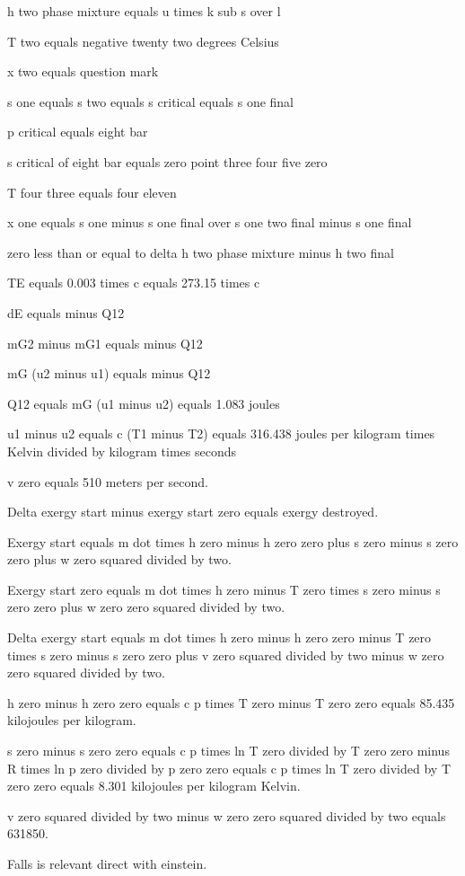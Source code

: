 h two phase mixture equals u times k sub s over l

T two equals negative twenty two degrees Celsius

x two equals question mark

s one equals s two equals s critical equals s one final

p critical equals eight bar

s critical of eight bar equals zero point three four five zero

T four three equals four eleven

x one equals s one minus s one final over s one two final minus s one final

zero less than or equal to delta h two phase mixture minus h two final

TE equals 0.003 times c equals 273.15 times c

dE equals minus Q12

mG2 minus mG1 equals minus Q12

mG (u2 minus u1) equals minus Q12

Q12 equals mG (u1 minus u2) equals 1.083 joules

u1 minus u2 equals c (T1 minus T2) equals 316.438 joules per kilogram times Kelvin divided by kilogram times seconds

v zero equals 510 meters per second.

Delta exergy start minus exergy start zero equals exergy destroyed.

Exergy start equals m dot times h zero minus h zero zero plus s zero minus s zero zero plus w zero squared divided by two.

Exergy start zero equals m dot times h zero minus T zero times s zero minus s zero zero plus w zero zero squared divided by two.

Delta exergy start equals m dot times h zero minus h zero zero minus T zero times s zero minus s zero zero plus v zero squared divided by two minus w zero zero squared divided by two.

h zero minus h zero zero equals c p times T zero minus T zero zero equals 85.435 kilojoules per kilogram.

s zero minus s zero zero equals c p times ln T zero divided by T zero zero minus R times ln p zero divided by p zero zero equals c p times ln T zero divided by T zero zero equals 8.301 kilojoules per kilogram Kelvin.

v zero squared divided by two minus w zero zero squared divided by two equals 631850.

Falls is relevant direct with einstein.